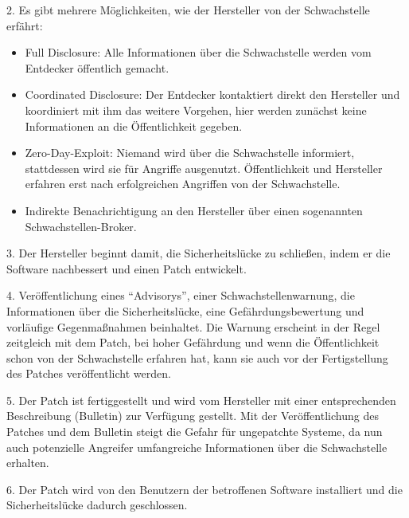 \documentclass[12pt,oneside,a4paper,parskip,pointlessnumbers]{scrbook}
\begin{document}
  2. Es gibt mehrere Möglichkeiten, wie der Hersteller von der Schwachstelle erfährt:
  \begin{itemize}
    \item \glqq Full Disclosure\grqq: Alle Informationen über die Schwachstelle werden vom Entdecker öffentlich gemacht.
    \item \glqq Coordinated Disclosure\grqq: Der Entdecker kontaktiert direkt den Hersteller und koordiniert mit ihm das weitere Vorgehen, hier werden zunächst keine Informationen an die Öffentlichkeit gegeben.
    \item \glqq Zero-Day-Exploit\grqq: Niemand wird über die Schwachstelle informiert, stattdessen wird sie für Angriffe ausgenutzt. Öffentlichkeit und Hersteller erfahren erst nach erfolgreichen Angriffen von der Schwachstelle.
    \item Indirekte Benachrichtigung an den Hersteller über einen sogenannten Schwachstellen-Broker. \end{itemize}
  3. Der Hersteller beginnt damit, die Sicherheitslücke zu schließen, indem er die Software nachbessert und einen Patch entwickelt.

  4. Veröffentlichung eines ``Advisorys'', einer Schwachstellenwarnung, die Informationen über die Sicherheitslücke, eine Gefährdungsbewertung und vorläufige Gegenmaßnahmen beinhaltet.
  Die Warnung erscheint in der Regel zeitgleich mit dem Patch, bei hoher Gefährdung und wenn die Öffentlichkeit schon von der Schwachstelle erfahren hat, kann sie auch vor der Fertigstellung des Patches veröffentlicht werden.

  5. Der Patch ist fertiggestellt und wird vom Hersteller mit einer entsprechenden Beschreibung (Bulletin) zur Verfügung gestellt. Mit der Veröffentlichung des Patches und dem Bulletin steigt die Gefahr für ungepatchte Systeme, da nun auch potenzielle Angreifer umfangreiche Informationen über die Schwachstelle
  erhalten.

  6. Der Patch wird von den Benutzern der betroffenen Software installiert und die Sicherheitslücke dadurch geschlossen.
\end{document}
